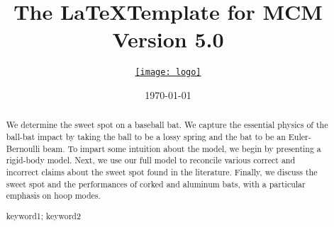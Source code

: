 \documentclass[a4paper, 11pt]{article}
\title{The \LaTeX Template for  MCM Version 5.0}
\author{\small \href{http://www.latexstudio.net/}{\texttt{[image: logo]}}}
\date{\today}
\begin{document}
\begin{abstract}
We determine the sweet spot on a baseball bat. We capture the essential
physics of the ball-bat impact by taking the ball to be a lossy spring and the
bat to be an Euler-Bernoulli beam. To impart some intuition about the model,
we begin by presenting a rigid-body model. Next, we use our full model
to reconcile various correct and incorrect claims about the sweet spot found
in the literature. Finally, we discuss the sweet spot and the performances of
corked and aluminum bats, with a particular emphasis on hoop modes.
\begin{keywords}
keyword1; keyword2
\end{keywords}
\end{abstract}
\maketitle
\pagestyle{empty}
\newpage
\pagestyle{fancy}

\end{document}
